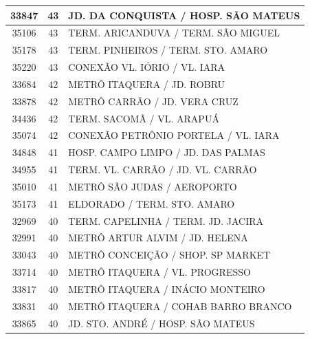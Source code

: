 \documentclass[
	12pt,				%
	oneside,			%
	a4paper,			%
	english,			%
	brazil				%
	]{abntex2ppgsi}
\begin{document}
{{\begin{apendicesenv}
\begin{longtable}{c|c|p{7cm}}
    33847 & 43    & JD. DA CONQUISTA / HOSP. SÃO MATEUS \\
\hline

    35106 & 43    & TERM. ARICANDUVA / TERM. SÃO MIGUEL \\
\hline

    35178 & 43    & TERM. PINHEIROS / TERM. STO. AMARO \\
\hline

    35220 & 43    & CONEXÃO VL. IÓRIO / VL. IARA \\
\hline

    33684 & 42    & METRÔ ITAQUERA / JD. ROBRU \\
\hline

    33878 & 42    & METRÔ CARRÃO / JD. VERA CRUZ  \\
\hline

    34436 & 42    & TERM. SACOMÃ / VL. ARAPUÁ \\
\hline

    35074 & 42    & CONEXÃO PETRÔNIO PORTELA / VL. IARA \\
\hline

    34848 & 41    & HOSP. CAMPO LIMPO / JD. DAS PALMAS \\
\hline

    34955 & 41    & TERM. VL. CARRÃO / JD. VL. CARRÃO \\
\hline

    35010 & 41    & METRÔ SÃO JUDAS / AEROPORTO \\
\hline

    35173 & 41    & ELDORADO / TERM. STO. AMARO \\
\hline

    32969 & 40    & TERM. CAPELINHA / TERM. JD. JACIRA \\
\hline

    32991 & 40    & METRÔ ARTUR ALVIM / JD. HELENA \\
\hline

    33043 & 40    & METRÔ CONCEIÇÃO / SHOP. SP MARKET \\
\hline

    33714 & 40    & METRÔ ITAQUERA / VL. PROGRESSO \\
\hline

    33817 & 40    & METRÔ ITAQUERA / INÁCIO MONTEIRO \\
\hline

    33831 & 40    & METRÔ ITAQUERA / COHAB BARRO BRANCO \\
\hline

    33865 & 40    & JD. STO. ANDRÉ / HOSP. SÃO MATEUS \\
\hline


\end{longtable}
\end{apendicesenv}}}
\end{document}
